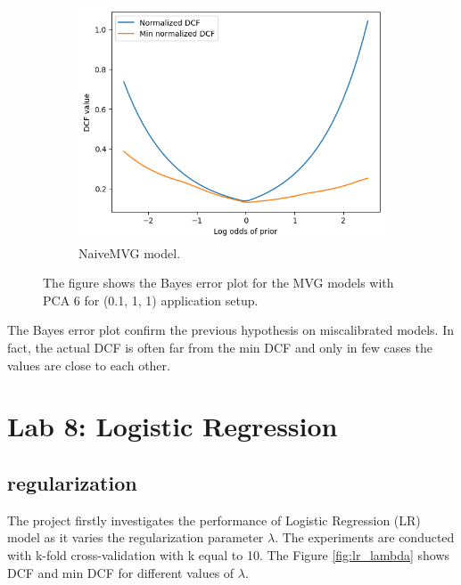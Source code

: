 \documentclass{article}
\begin{document}
\begin{figure}[ht]
\begin{subfigure}[b]{0.3\textwidth}
        \includegraphics[width=\textwidth]{images/bayes_error_naivemvg.png}
        \caption{NaiveMVG model.}
    \end{subfigure}
    \caption{The figure shows the Bayes error plot for the MVG models with PCA 6 for (0.1, 1, 1) application setup.}
    \label{fig:bayes_error_mvg}
\end{figure}

The Bayes error plot confirm the previous hypothesis on miscalibrated models. In fact, the actual DCF is often far from the min DCF and only in few cases the values are close to each other. 

\section{Lab 8: Logistic Regression}
\label{sec:logistic_regression}

\subsection{regularization}
The project firstly investigates the performance of Logistic Regression (LR) model as it varies the regularization parameter $\lambda$. The experiments are conducted with k-fold cross-validation with k equal to 10. The Figure \ref{fig:lr_lambda} shows DCF and min DCF for different values of $\lambda$.
\end{document}
